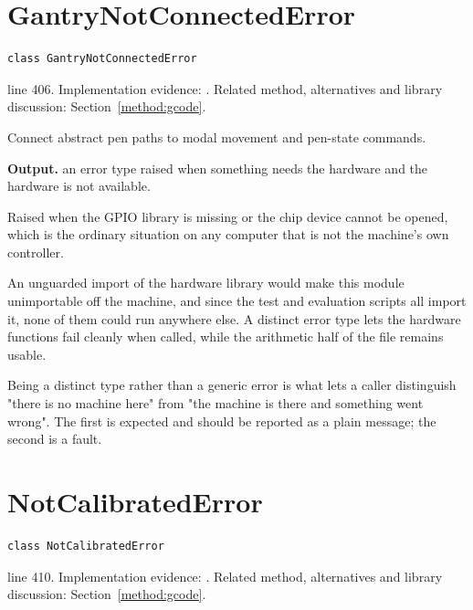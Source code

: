 \section{GantryNotConnectedError}\label{fn:reproduce:GantryNotConnectedError}
\begin{lstlisting}[style=sig]
class GantryNotConnectedError
\end{lstlisting}
 line 406. Implementation evidence: \cite{code2026}. Related method, alternatives and library discussion: Section~\ref{method:gcode}.


Connect abstract pen paths to modal movement and pen-state commands.




\noindent\textbf{Output.} an error type raised when something needs the hardware and the hardware is not available.


Raised when the GPIO library is missing or the chip device cannot be opened, which is the ordinary situation on any computer that is not the machine's own controller.


An unguarded import of the hardware library would make this module unimportable off the machine, and since the test and evaluation scripts all import it, none of them could run anywhere else. A distinct error type lets the hardware functions fail cleanly when called, while the arithmetic half of the file remains usable.

Being a distinct type rather than a generic error is what lets a caller distinguish "there is no machine here" from "the machine is there and something went wrong". The first is expected and should be reported as a plain message; the second is a fault.



\section{NotCalibratedError}\label{fn:reproduce:NotCalibratedError}
\begin{lstlisting}[style=sig]
class NotCalibratedError
\end{lstlisting}
 line 410. Implementation evidence: \cite{code2026}. Related method, alternatives and library discussion: Section~\ref{method:gcode}.


